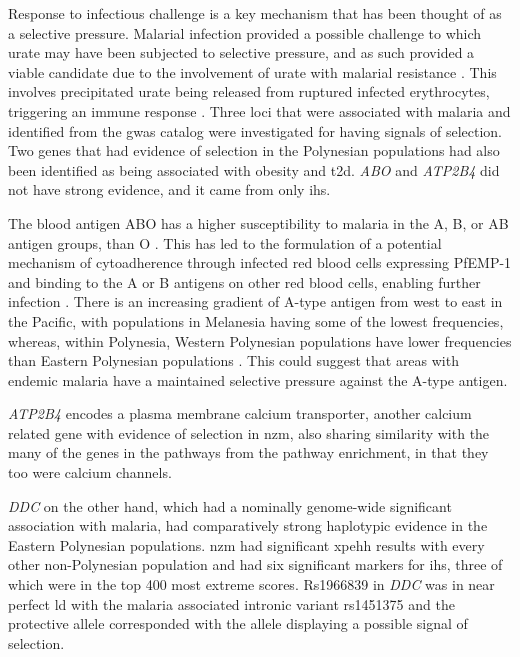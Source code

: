 \documentclass[twoside,openright]{report}
\begin{document}
Response to infectious challenge is a key mechanism that has been
thought of as a selective pressure. Malarial infection provided a
possible challenge to which urate may have been subjected to selective
pressure, and as such provided a viable candidate due to the involvement
of urate with malarial resistance \citep{GallegoDelgado2014}. This
involves precipitated urate being released from ruptured infected
erythrocytes, triggering an immune response
\citep{orengo_uric_2009, GallegoDelgado2014}. Three loci that were
associated with malaria and identified from the \gls{gwas} catalog were
investigated for having signals of selection. Two genes that had
evidence of selection in the Polynesian populations had also been
identified as being associated with obesity and \gls{t2d}. \emph{ABO}
and \emph{ATP2B4} did not have strong evidence, and it came from only
\gls{ihs}.

The blood antigen ABO has a higher susceptibility to malaria in the A,
B, or AB antigen groups, than O \citep{Zerihun2011}. This has led to the
formulation of a potential mechanism of cytoadherence through infected
red blood cells expressing PfEMP-1 and binding to the A or B antigens on
other red blood cells, enabling further infection \citep{Cserti2015}.
There is an increasing gradient of A-type antigen from west to east in
the Pacific, with populations in Melanesia having some of the lowest
frequencies, whereas, within Polynesia, Western Polynesian populations
have lower frequencies than Eastern Polynesian populations
\citep{Simmons1962}. This could suggest that areas with endemic malaria
have a maintained selective pressure against the A-type antigen.

\emph{ATP2B4} encodes a plasma membrane calcium transporter, another
calcium related gene with evidence of selection in \gls{nzm}, also
sharing similarity with the many of the genes in the pathways from the
pathway enrichment, in that they too were calcium channels.

\emph{DDC} on the other hand, which had a nominally genome-wide
significant association with malaria, had comparatively strong
haplotypic evidence in the Eastern Polynesian populations. \Gls{nzm} had
significant \gls{xpehh} results with every other non-Polynesian
population and had six significant markers for \gls{ihs}, three of which
were in the top 400 most extreme scores. Rs1966839 in \emph{DDC} was in
near perfect \gls{ld} with the malaria associated intronic variant
rs1451375 \citep{jallow2009genome} and the protective allele
corresponded with the allele displaying a possible signal of selection.
\end{document}

